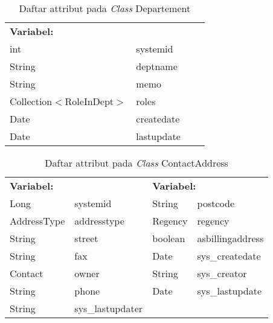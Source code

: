 \begin{table}[H]
	\caption{Daftar attribut pada \textit{Class} Departement}
	\centering
	\small
	\begin{adjustbox}{width=1\textwidth}	
		\begin{tabular}{|p{4cm} p{2.1cm} p{3cm} p{3.1cm}|}
			\hline
			\multicolumn{2}{|l}{\textbf{Variabel:}}&\multicolumn{2}{l|}{\textbf{}}\\
			int&systemid&&\\
			String&deptname&&\\
			String&memo&&\\
			Collection$<$RoleInDept$>$&roles&&\\
			Date&createdate&&\\
			Date&lastupdate&&\\
			\hline
		\end{tabular}
	\end{adjustbox}
\end{table}
\begin{table}[H]
	\caption{Daftar attribut pada \textit{Class} ContactAddress}
	\centering
	\small
	\begin{adjustbox}{width=1\textwidth}	
		\begin{tabular}{|p{4cm} p{2.1cm} p{3cm} p{3.1cm}|}
			\hline
			\multicolumn{2}{|l}{\textbf{Variabel:}}&\multicolumn{2}{l|}{\textbf{Variabel:}}\\
			Long&systemid&String&postcode\\
			AddressType&addresstype&Regency&regency\\
			String&street&boolean&asbillingaddress\\
			String&fax&Date&sys\_createdate\\
			Contact&owner&String&sys\_creator\\
			String&phone&Date&sys\_lastupdate\\
			String&sys\_lastupdater&&\\
			\hline
		\end{tabular}
	\end{adjustbox}
\end{table}

